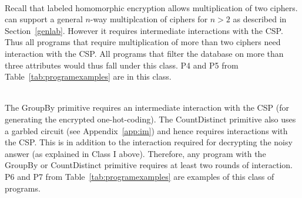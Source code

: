 \\
Recall that labeled homomorphic encryption allows multiplication of two ciphers. \system can support a general $n$-way multiplcation of ciphers for $n > 2$ as described in Section~\ref{genlab}. However it requires intermediate interactions with the \textsf{CSP}. Thus all \system programs that require multiplication of more than two ciphers need interaction with the \textsf{CSP}.  All programs that filter the database on more than three attributes would thus fall under this class. P4 and P5 from Table~\ref{tab:programexamples} are in this class.

\\
 The \textsf{GroupBy} primitive requires an intermediate interaction with the \textsf{CSP} (for generating the encrypted one-hot-coding). The \textsf{CountDistinct} primitive also uses a garbled circuit (see Appendix~\ref{app:im}) and hence requires interactions with the \textsf{CSP}. This is in addition to the interaction required for decrypting the noisy answer (as explained in Class I above). Therefore, any program with the \textsf{GroupBy} or \textsf{CountDistinct} primitive requires at least two rounds of interaction. P6 and P7 from Table~\ref{tab:programexamples} are examples of this class of \system programs. 


